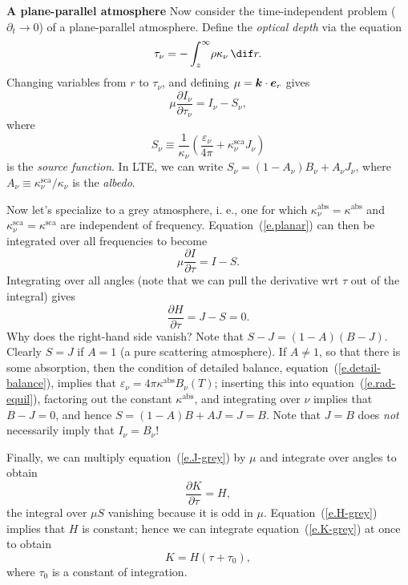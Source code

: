 \textbf{A plane-parallel atmosphere}
Now consider the time-independent problem ($\partial_{t}\to 0$) of a plane-parallel atmosphere. Define the \emph{optical depth} via the equation
\begin{equation}\label{e.optical-depth}
\tau_{\nu} = - \int _{z}^{\infty}\!\rho\kappa_{\nu}\,\dif r.
\end{equation}
Changing variables from $r$ to $\tau_{\nu}$, and defining $\mu = \boldsymbol{k}\cdot\boldsymbol{e}_{r}$ gives
\begin{equation}\label{e.planar}
\mu\frac{\partial I_{\nu}}{\partial\tau_{\nu}} = I_{\nu}-S_{\nu},
\end{equation}
where 
\begin{equation}\label{e.source}
S_{\nu} \equiv \frac{1}{\kappa_{\nu}}\left(\frac{\varepsilon_{\nu}}{4\pi} + \kappa_{\nu}^{\mathrm{sca}}J_{\nu}\right)
\end{equation}
is the \emph{source function}. In LTE, we can write $S_{\nu} = (1-A_{\nu})B_{\nu} + A_{\nu}J_{\nu}$, where $A_{\nu} \equiv \kappa_{\nu}^{\mathrm{sca}}/\kappa_{\nu}$ is the \emph{albedo}.

Now let's specialize to a grey atmosphere, i. e., one for which $\kappa_{\nu}^{\mathrm{abs}} = \kappa^{\mathrm{abs}}$ and $\kappa_{\nu}^{\mathrm{sca}} = \kappa^{\mathrm{sca}}$ are independent of frequency. Equation~(\ref{e.planar}) can then be integrated over all frequencies to become
\begin{equation}\label{e.J-grey}
\mu\frac{\partial I}{\partial\tau} = I-S.
\end{equation}
Integrating over all angles (note that we can pull the derivative wrt $\tau$ out of the integral) gives
\begin{equation}\label{e.H-grey}
\frac{\partial H}{\partial\tau} = J - S = 0.
\end{equation}
Why does the right-hand side vanish? Note that $S-J = (1-A)(B-J)$.  Clearly $S = J$ if $A = 1$ (a pure scattering atmosphere).  If $A \ne 1$, so that there is some absorption, then the condition of detailed balance, equation~(\ref{e.detail-balance}), implies that $\varepsilon_{\nu} = 4\pi\kappa^{\mathrm{abs}}B_{\nu}(T)$; inserting this into equation~(\ref{e.rad-equil}), factoring out the constant $\kappa^{\mathrm{abs}}$, and integrating over $\nu$ implies that $B - J = 0$, and hence $S = (1-A)B + AJ = J = B$. Note that $J = B$ does \emph{not} necessarily imply that $I_{\nu} = B_{\nu}$!

Finally, we can multiply equation~(\ref{e.J-grey}) by $\mu$ and integrate over angles to obtain
\begin{equation}\label{e.K-grey}
\frac{\partial K}{\partial\tau} = H,
\end{equation}
the integral over $\mu S$ vanishing because it is odd in $\mu$. Equation~(\ref{e.H-grey}) implies that $H$ is constant; hence we can integrate equation~(\ref{e.K-grey}) at once to obtain
\begin{equation}\label{e.KH}
K = H(\tau + \tau_{0}),
\end{equation}
where $\tau_{0}$ is a constant of integration.

